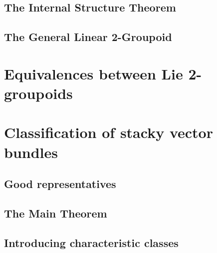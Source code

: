 

\section{The Internal Structure Theorem}



\section{The General Linear 2-Groupoid}\label{sec:gl2gpd}




\chapter{Equivalences between Lie 2-groupoids}\label{ch:equivalences}










\chapter{Classification of stacky vector bundles}\label{ch:main-thm}

\section{Good representatives}



\section{The Main Theorem}



\section{Introducing characteristic classes}

